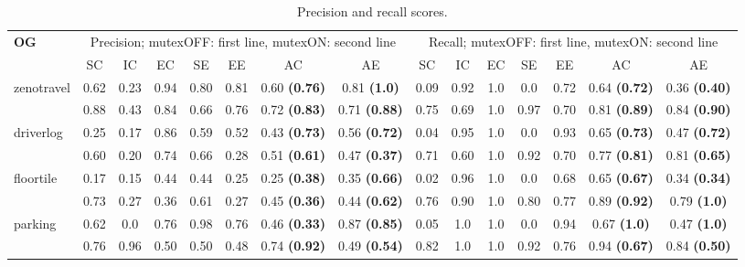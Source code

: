 \documentclass{ecai}
\begin{document}
\begin{table*}
	\caption{Precision and recall scores.}
	\begin{center}
		{%
			\scriptsize 
			\begin{tabular}{lccccc|cc||ccccc|cc}
				\textbf{OG} & \multicolumn{7}{c}{Precision; mutexOFF: first line, mutexON: second line} & \multicolumn{7}{c}{Recall; mutexOFF: first line, mutexON: second line}  \\	
				\cline{2-15}
				& SC & IC & EC & SE & EE & AC & AE & SC & IC & EC & SE & EE & AC & AE \\ 
				\cline{2-15}
				
				\multirow{2}{*}{zenotravel} & 0.62 &	0.23 &	0.94 &	0.80 &	0.81 &	0.60 \textbf{(0.76)} &	0.81 \textbf{(1.0)}  & 0.09 &	0.92 &	1.0 &	0.0 &	0.72 &	0.64 \textbf{(0.72)} &	0.36 \textbf{(0.40)} \\
				& 0.88 &	0.43 &	0.84 &	0.66 &	0.76 &	0.72 \textbf{(0.83)} &	0.71 \textbf{(0.88)}  & 0.75	& 0.69 & 1.0 & 0.97 &	0.70 &	0.81 \textbf{(0.89)} &	0.84 \textbf{(0.90)} \\
				
				\cline{2-15}
				
				\multirow{2}{*}{driverlog} & 0.25 &	0.17 &	0.86 &	0.59 &	0.52 &	0.43 \textbf{(0.73)} & 0.56 \textbf{(0.72)} &  0.04	& 0.95 &	1.0 &	0.0 &	0.93 & 0.65 \textbf{(0.73)} &	0.47 \textbf{(0.72)} \\
				& 0.60 &	0.20 &	0.74 &	0.66 &	0.28 &	0.51  \textbf{(0.61)} &	0.47 \textbf{(0.37)} & 0.71	& 0.60 &	1.0 &	0.92 &	0.70 &	0.77 \textbf{(0.81)} &	0.81 \textbf{(0.65)} \\
				\cline{2-15}	
				
				\multirow{2}{*}{floortile} & 0.17	& 0.15 & 0.44 &	0.44 &	0.25 &	0.25 \textbf{(0.38)} &	0.35 \textbf{(0.66)} & 0.02	& 0.96 & 1.0 & 0.0 &	0.68 &	0.65 \textbf{(0.67)} & 0.34 \textbf{(0.34)} \\
				& 0.73	& 0.27 & 0.36 &	0.61 &	0.27 &	0.45 \textbf{(0.36)} &	0.44 \textbf{(0.62)} & 0.76 & 0.90 & 1.0 & 0.80 &	0.77  &	0.89 \textbf{(0.92)} &	0.79 \textbf{(1.0)} \\
				
				\cline{2-15}
				
				\multirow{2}{*}{parking} & 0.62 &	0.0	& 0.76 &	0.98 &	0.76 &	0.46 \textbf{(0.33)} &	0.87 \textbf{(0.85)} & 0.05 &	1.0 &	1.0	& 0.0 &	0.94 &	0.67 \textbf{(1.0)} &	0.47 \textbf{(1.0)} \\
				& 0.76 &	0.96 &	0.50 &	0.50 &	0.48 &	0.74 \textbf{(0.92)} &	0.49 \textbf{(0.54)} & 0.82 &	1.0 &	1.0 &	0.92 &	0.76 &	0.94 \textbf{(0.67)} &	0.84 \textbf{(0.50)} \\
				\hline
			\end{tabular}
			
}
\end{center}
\end{table*}
\end{document}
